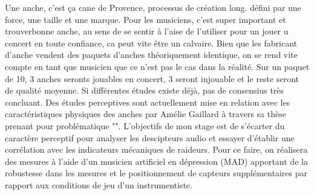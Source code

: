 
\vfill

Une anche, c'est ça cane de Provence, processus de création long. défini par une force, une taille et une marque. 
Pour les musiciens, c'est super important et trouverbonne anche, au sens de se sentir à l'aise de l'utiliser pour un jouer u concert en toute confiance, ca peut vite être un calvaire. Bien que les fabricant d'anche vendent des paquets d'anches théoriquement identique, on se rend vite compte en tant que musicien que ce n'est pas le cas dans la réalité. Sur un paquet de 10, 3 anches seronts jouables en concert, 3 seront injouable et le reste seront de qualité moyenne. Si différentes études existe déjà, pas de consensius très concluant. 
Des études perceptives sont actuellement mise en relation avec les caractéristiques physiques des anches  par Amélie Gaillard à travers sa thèse prenant pour problématique "". L'objectifs de mon stage est de s'écarter du caractère perceptif pour analyser les descipteurs audio et essayer d'établir une corrélation avec les indicateurs mécaniques de raideurs. Pour ce faire, on réalisera des mesures à l'aide d'un musicien artificiel en dépression (MAD) apportant de la robustesse dans les mesures et le positionnement de capteurs supplémentaires par rapport aux conditions de jeu d'un instrumentiste.


\vfill
